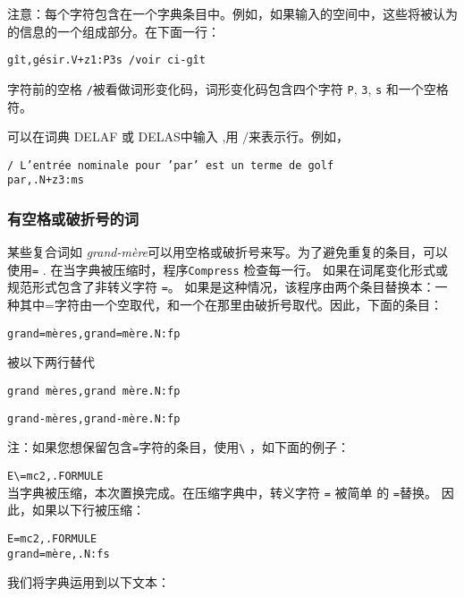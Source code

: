 \bigskip
\noindent 注意：每个字符包含在一个字典条目中。例如，如果输入的空间中，这些将被认为的信息的一个组成部分。在下面一行：


\begin{verbatim}
gît,gésir.V+z1:P3s /voir ci-gît
\end{verbatim}

\bigskip \noindent 字符前的空格 \verb+/+被看做词形变化码，词形变化码包含四个字符 \verb+P+, \verb+3+, \verb+s+ 和一个空格符。


\bigskip \noindent 可以在词典 DELAF 或 DELAS中输入
,用 $/$来表示行。例如，

\bigskip
\begin{verbatim}
/ L’entrée nominale pour ’par’ est un terme de golf
par,.N+z3:ms
\end{verbatim}


\subsubsection{有空格或破折号的词}

\index{\verb+=+}\index{\verb+\=+}

某些复合词如 \textit{grand-mère}可以用空格或破折号来写。为了避免重复的条目，可以使用\verb+=+ . 在当字典被压缩时，程序\verb+Compress+
 检查每一行。
如果在词尾变化形式或规范形式包含了非转义字符 \verb+=+。 如果是这种情况，该程序由两个条目替换本：一种其中=字符由一个空取代，和一个在那里由破折号取代。因此，下面的条目：


\bigskip \verb$grand=mères,grand=mère.N:fp$

\bigskip
\noindent 被以下两行替代

\bigskip
\verb$grand mères,grand mère.N:fp$

\verb$grand-mères,grand-mère.N:fp$


\bigskip
\noindent 注：如果您想保留包含\verb+=+字符的条目，使用\verb+\+ ，如下面的例子：


\bigskip
\verb$E\=mc2,.FORMULE$\\

当字典被压缩，本次置换完成。在压缩字典中，转义字符 \verb+=+ 被简单 的 \verb+=+替换。
因此，如果以下行被压缩： 

\begin{verbatim}
E=mc2,.FORMULE
grand=mère,.N:fs
\end{verbatim}

\noindent 我们将字典运用到以下文本：

